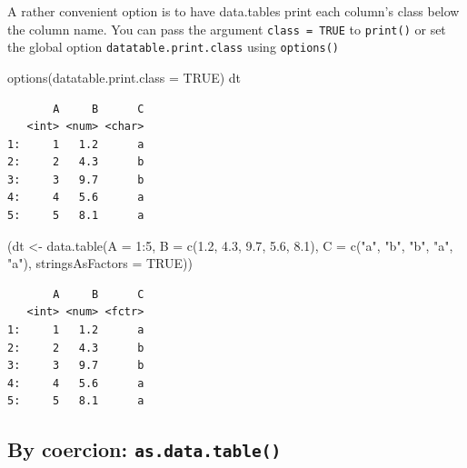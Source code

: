 \documentclass[
]{book}
\newenvironment{Shaded}{\begin{snugshade}}{\end{snugshade}}
\newcommand{\AttributeTok}[1]{\textcolor[rgb]{0.77,0.63,0.00}{#1}}
\newcommand{\ConstantTok}[1]{\textcolor[rgb]{0.00,0.00,0.00}{#1}}
\newcommand{\DecValTok}[1]{\textcolor[rgb]{0.00,0.00,0.81}{#1}}
\newcommand{\FloatTok}[1]{\textcolor[rgb]{0.00,0.00,0.81}{#1}}
\newcommand{\FunctionTok}[1]{\textcolor[rgb]{0.00,0.00,0.00}{#1}}
\newcommand{\NormalTok}[1]{#1}
\newcommand{\OtherTok}[1]{\textcolor[rgb]{0.56,0.35,0.01}{#1}}
\newcommand{\SpecialCharTok}[1]{\textcolor[rgb]{0.00,0.00,0.00}{#1}}
\newcommand{\StringTok}[1]{\textcolor[rgb]{0.31,0.60,0.02}{#1}}
\begin{document}
A rather convenient option is to have data.tables print each column's class below the column name. You can pass the argument \texttt{class\ =\ TRUE} to \texttt{print()} or set the global option \texttt{datatable.print.class} using \texttt{options()}

\begin{Shaded}
\begin{Highlighting}[]
\FunctionTok{options}\NormalTok{(}\AttributeTok{datatable.print.class =} \ConstantTok{TRUE}\NormalTok{)}
\NormalTok{dt}
\end{Highlighting}
\end{Shaded}

\begin{verbatim}
       A     B      C
   <int> <num> <char>
1:     1   1.2      a
2:     2   4.3      b
3:     3   9.7      b
4:     4   5.6      a
5:     5   8.1      a
\end{verbatim}

\begin{Shaded}
\begin{Highlighting}[]
\NormalTok{(dt }\OtherTok{\textless{}{-}} \FunctionTok{data.table}\NormalTok{(}\AttributeTok{A =} \DecValTok{1}\SpecialCharTok{:}\DecValTok{5}\NormalTok{,}
                  \AttributeTok{B =} \FunctionTok{c}\NormalTok{(}\FloatTok{1.2}\NormalTok{, }\FloatTok{4.3}\NormalTok{, }\FloatTok{9.7}\NormalTok{, }\FloatTok{5.6}\NormalTok{, }\FloatTok{8.1}\NormalTok{),}
                  \AttributeTok{C =} \FunctionTok{c}\NormalTok{(}\StringTok{"a"}\NormalTok{, }\StringTok{"b"}\NormalTok{, }\StringTok{"b"}\NormalTok{, }\StringTok{"a"}\NormalTok{, }\StringTok{"a"}\NormalTok{),}
                  \AttributeTok{stringsAsFactors =} \ConstantTok{TRUE}\NormalTok{))}
\end{Highlighting}
\end{Shaded}

\begin{verbatim}
       A     B      C
   <int> <num> <fctr>
1:     1   1.2      a
2:     2   4.3      b
3:     3   9.7      b
4:     4   5.6      a
5:     5   8.1      a
\end{verbatim}

\hypertarget{by-coercion-as.data.table}{%
\subsection{\texorpdfstring{By coercion: \texttt{as.data.table()}}{By coercion: as.data.table()}}\label{by-coercion-as.data.table}}
\end{document}
